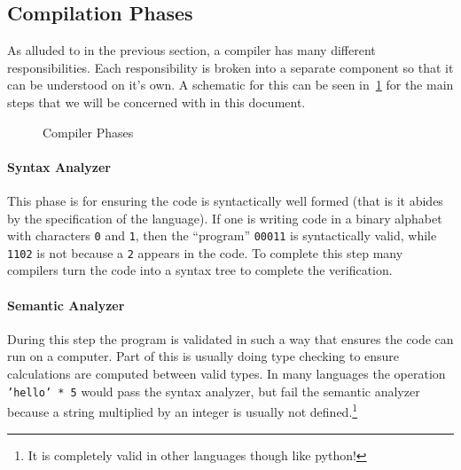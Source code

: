 \subsection{Compilation Phases}

As alluded to in the previous section, a compiler has many different responsibilities.
Each responsibility is broken into a separate component so that it can be understood on it's own.
A schematic for this can be seen in~\cref{fig:compilerphases} for the main steps that we will be concerned with in this document.
\begin{figure}%
    \centering
    
    \caption{Compiler Phases}\label{fig:compilerphases}
\end{figure}

\paragraph{Syntax Analyzer}
This phase is for ensuring the code is syntactically well formed (that is it abides by the specification of the language).
If one is writing code in a binary alphabet with characters \texttt{0} and \texttt{1}, then the ``program'' \texttt{00011} is syntactically valid, while \texttt{1102} is not because a \texttt{2} appears in the code.
To complete this step many compilers turn the code into a syntax tree to complete the verification.

\paragraph{Semantic Analyzer}
During this step the program is validated in such a way that ensures the code can run on a computer.
Part of this is usually doing type checking to ensure calculations are computed between valid types.
In many languages the operation \texttt{'hello' * 5} would pass the syntax analyzer, but fail the semantic analyzer because a string multiplied by an integer is usually not defined.\footnote{It is completely valid in other languages though like python!}


